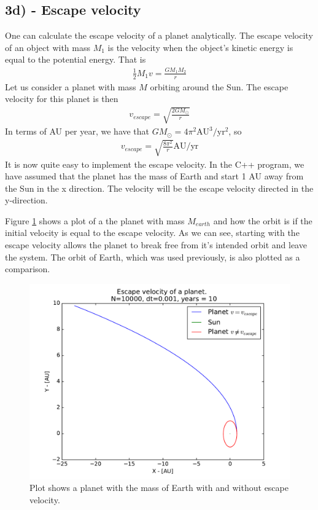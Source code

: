 \documentclass[12pt]{article}
\begin{document}
\subsection*{3d) - Escape velocity}
One can calculate the escape velocity of a planet analytically. The escape velocity of an object with mass $M_1$ is the velocity when the object's kinetic energy is equal to the potential energy. That is
\begin{align*}
\frac{1}{2}M_1v = \frac{GM_1M_2}{r}
\end{align*}
Let us consider a planet with mass $M$ orbiting around the Sun. The escape velocity for this planet is then
\begin{align*}
v_{escape} = \sqrt{\frac{2GM_{\odot}}{r}}
\end{align*}
In terms of AU per year, we have that $GM_{\odot} = 4\pi^2 \text{AU}^3/\text{yr}^2$, so
\begin{align*}
v_{escape} = \sqrt{\frac{8\pi^2}{r}} \text{AU}/\text{yr}
\end{align*}
It is now quite easy to implement the escape velocity. In the C++ program, we have assumed that the planet has the mass of Earth and start 1 AU away from the Sun in the x direction. The velocity will be the escape velocity directed in the y-direction. 

Figure \ref{fig:EscapeVel} shows a plot of a the planet with mass $M_{earth}$ and how the orbit is if the initial velocity is equal to the escape velocity. As we can see, starting with the escape velocity allows the planet to break free from it's intended orbit and leave the system. The orbit of Earth, which was used previously, is also plotted as a comparison.

\begin{figure}[!h]
\centering
\includegraphics[width=\linewidth]{Plots/Escape_velocity.pdf}
\caption{Plot shows a planet with the mass of Earth with and without escape velocity.}
\label{fig:EscapeVel}
\end{figure}
\FloatBarrier
\end{document}
